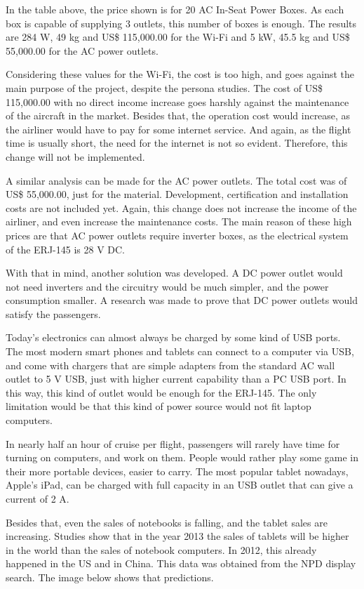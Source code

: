 In the table above, the price shown is for 20 AC In-Seat Power Boxes. As each box is capable of supplying 3 outlets, this number of boxes is enough. The results are 284 W, 49 kg and US\$ 115,000.00 for the Wi-Fi and 5 kW, 45.5 kg and US\$ 55,000.00 for the AC power outlets.

Considering these values for the Wi-Fi, the cost is too high, and goes against the main purpose of the project, despite the persona studies. The cost of US\$ 115,000.00 with no direct income increase goes harshly against the maintenance of the aircraft in the market. Besides that, the operation cost would increase, as the airliner would have to pay for some internet service. And again, as the flight time is usually short, the need for the internet is not so evident. Therefore, this change will not be implemented.

A similar analysis can be made for the AC power outlets. The total cost was of  US\$ 55,000.00, just for the material. Development, certification and installation costs are not included yet. Again, this change does not increase the income of the airliner, and even increase the maintenance costs. The main reason of these high prices are that AC power outlets require inverter boxes, as the electrical system of the ERJ-145 is 28 V DC.

With that in mind, another solution was developed. A DC power outlet would not need inverters and the circuitry would be much simpler, and the power consumption smaller. A research was made to prove that DC power outlets would satisfy the passengers.

Today's electronics can almost always be charged by some kind of USB ports. The most modern smart phones and tablets can connect to a computer via USB, and come with chargers that are simple adapters from the standard AC wall outlet to 5 V USB, just with higher current capability than a PC USB port. In this way, this kind of outlet would be enough for the ERJ-145. The only limitation would be that this kind of power source would not fit laptop computers.

In nearly half an hour of cruise per flight, passengers will rarely have time for turning on computers, and work on them. People would rather play some game in their more portable devices, easier to carry. The most popular tablet nowadays, Apple's iPad, can be charged with full capacity in an USB outlet that can give a current of 2 A.

Besides that, even the sales of notebooks is falling, and the tablet sales are increasing. Studies show that in the year 2013 the sales of tablets will be higher in the world than the sales of notebook computers. In 2012, this already happened in the US and in China. This data was obtained from the NPD display search. The image below shows that predictions. 

